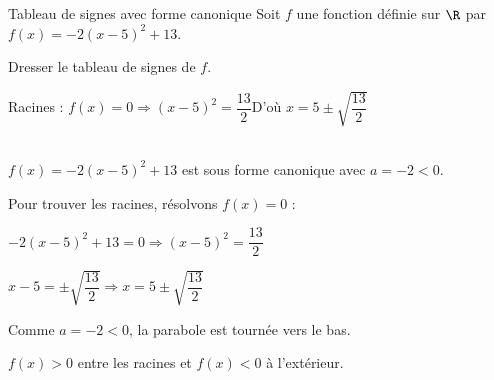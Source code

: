 \begin{EXO}{Tableau de signes avec forme canonique}{}
Soit $f$ une fonction définie sur $\R$ par $f(x) = -2(x-5)^2+13$. 

 Dresser le tableau de signes de $f$.

\begin{crep}
Racines : $f(x) = 0 \Rightarrow (x-5)^2 = \dfrac{13}{2}$\hfill D'où $x = 5 \pm \sqrt{\dfrac{13}{2}}$\hfill\phantom{a}\\\\
\begin{center}
\end{center}
\end{crep}

\exocorrection

$f(x) = -2(x-5)^2+13$ est sous forme canonique avec $a = -2 < 0$.

Pour trouver les racines, résolvons $f(x) = 0$ :

$-2(x-5)^2+13 = 0 \Rightarrow (x-5)^2 = \dfrac{13}{2}$

$x-5 = \pm\sqrt{\dfrac{13}{2}} \Rightarrow x = 5 \pm \sqrt{\dfrac{13}{2}}$

Comme $a = -2 < 0$, la parabole est tournée vers le bas.

$f(x) > 0$ entre les racines et $f(x) < 0$ à l'extérieur.
\end{EXO}
